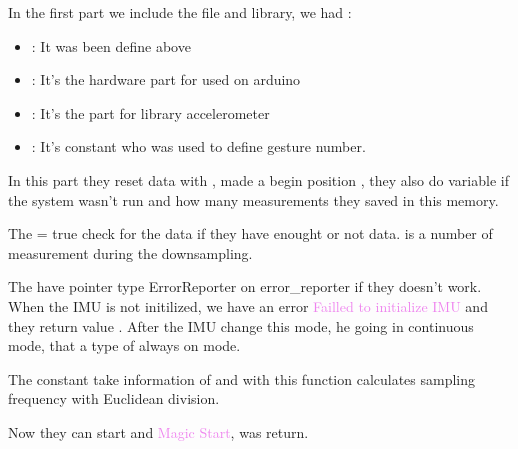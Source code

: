 In the first part we include the file and library, we had : 
\begin{itemize}
    \item {}: It was been define above
    \item {}: It's the hardware part for used on arduino 
    \item {}: It's the part for library accelerometer 
    \item {}: It's constant who was used to define gesture number.  
\end{itemize}

In this part they reset data with , made a begin position , they also do variable if the system wasn't run and how many measurements they saved in this memory. 

The  = true check for the data if they have enought or not data.   is a number of measurement during the downsampling. 

\begin{center}
    \label{Magic Wand Arduino Starting Accelerometer}
\end{center}


The  have pointer type ErrorReporter on error\_reporter if they doesn't work. When the IMU is not initilized, we have an error \textcolor{violet}{Failled to initialize IMU} and they return value . 
After the IMU change this mode, he going in continuous mode, that a type of always on mode.  

The constant  take information of   and with  this function calculates sampling frequency with Euclidean division.

Now they can start and \textcolor{violet}{Magic Start},  was return. 

\begin{center}
    		
    \label{Code: Magic Wand Arduino Read Accelerometer}
\end{center}


